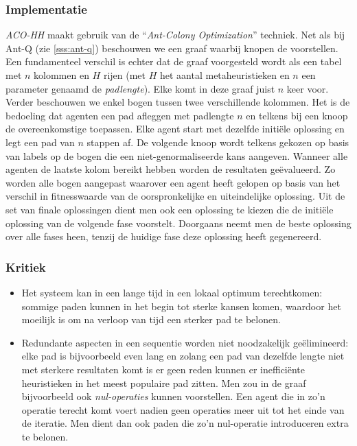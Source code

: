 \subsubsection{Implementatie}
\emph{ACO-HH}\cite{chesc-aco-hh} maakt gebruik van de ``\emph{Ant-Colony Optimization}''\cite{hom/aco} techniek. Net als bij Ant-Q (zie \ref{sss:ant-q}) beschouwen we een graaf waarbij knopen de \abllhn{} voorstellen. Een fundamenteel verschil is echter dat de graaf voorgesteld wordt als een tabel met $n$ kolommen en $H$ rijen (met $H$ het aantal metaheuristieken en $n$ een parameter genaamd de \emph{padlengte}). Elke \abllh{} komt in deze graaf juist $n$ keer voor. Verder beschouwen we enkel bogen tussen twee verschillende kolommen. Het is de bedoeling dat agenten een pad afleggen met padlengte $n$ en telkens bij een knoop de overeenkomstige \abllh{} toepassen. Elke agent start met dezelfde initi\"ele oplossing en legt een pad van $n$ stappen af. De volgende knoop wordt telkens gekozen op basis van labels op de bogen die een niet-genormaliseerde kans aangeven. Wanneer alle agenten de laatste kolom bereikt hebben worden de resultaten ge\"evalueerd. Zo worden alle bogen aangepast waarover een agent heeft gelopen op basis van het verschil in fitnesswaarde van de oorspronkelijke en uiteindelijke oplossing. Uit de set van finale oplossingen dient men ook een oplossing te kiezen die de initi\"ele oplossing van de volgende fase voorstelt. Doorgaans neemt men de beste oplossing over alle fases heen, tenzij de huidige fase deze oplossing heeft gegenereerd.
\subsubsection{Kritiek}
\begin{itemize}
 \item Het systeem kan in een lange tijd in een lokaal optimum terechtkomen: sommige paden kunnen in het begin tot sterke kansen komen, waardoor het moeilijk is om na verloop van tijd een sterker pad te belonen.
 \item Redundante aspecten in een sequentie worden niet noodzakelijk ge\"elimineerd: elke pad is bijvoorbeeld even lang en zolang een pad van dezelfde lengte niet met sterkere resultaten komt is er geen reden kunnen er ineffici\"ente heuristieken in het meest populaire pad zitten. Men zou in de graaf bijvoorbeeld ook \emph{nul-operaties} kunnen voorstellen. Een agent die in zo'n operatie terecht komt voert nadien geen operaties meer uit tot het einde van de iteratie. Men dient dan ook paden die zo'n nul-operatie introduceren extra te belonen.
\end{itemize}
